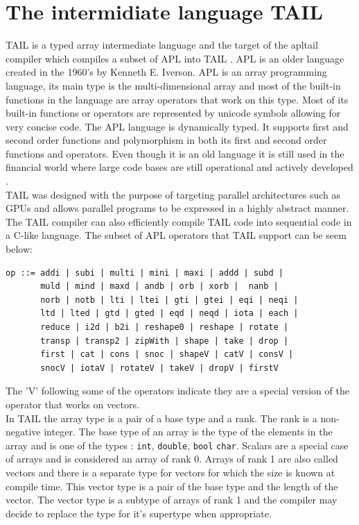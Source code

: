 \documentclass[11pt]{article}
\begin{document}
\section{The intermidiate language TAIL}

TAIL is a typed array intermediate language and the target of the apltail compiler which
compiles a subset of APL into TAIL \cite{ElsmanDybdal:Array:2014}.
APL is an older language created in the 1960's by Kenneth E. Iverson.
APL is an array programming language, its main type is the multi-dimensional array 
and most of the built-in functions in the language are array operators that work on this type. 
Most of its built-in functions or operators are represented by unicode symbols allowing for very concise code.
The APL language is dynamically typed. It supports first and second order functions and polymorphism in 
both its first and second order functions and operators. 
Even though it is an old language it is still used in the financial world 
where large code bases are still operational and actively developed \cite{ElsmanDybdal:Array:2014}. \\



TAIL was designed with the purpose of targeting parallel architectures such as GPUs and allows parallel programs to be
expressed in a highly abstract manner.
The TAIL compiler can also efficiently compile TAIL code into sequential code in a C-like language.
The subset of APL operators that TAIL support can be seem below:

\begin{lstlisting}[numbers=none,frame=none]
op ::= addi | subi | multi | mini | maxi | addd | subd | 
       muld | mind | maxd | andb | orb | xorb |  nanb | 
       norb | notb | lti | ltei | gti | gtei | eqi | neqi |
       ltd | lted | gtd | gted | eqd | neqd | iota | each |
       reduce | i2d | b2i | reshape0 | reshape | rotate |
       transp | transp2 | zipWith | shape | take | drop |
       first | cat | cons | snoc | shapeV | catV | consV | 
       snocV | iotaV | rotateV | takeV | dropV | firstV 
\end{lstlisting}

The 'V' following some of the operators indicate they are a special version of the operator that works on vectors. \\


In TAIL the array type is a pair of a base type and a rank. The rank is a non-negative integer.
The base type of an array is the type of the elements in the array and is one of the types
: {\tt int}, {\tt double}, {\tt bool} {\tt char}. 
Scalars are a special case of arrays and is considered an array of rank 0.
Arrays of rank 1 are also called vectors and there is a separate type for vectors for which the size is known at compile time.
This vector type is a pair of the base type and the length of the vector. The vector type is a subtype of arrays of rank 1 and
the compiler may decide to replace the type for it's supertype when appropriate.
\end{document}
